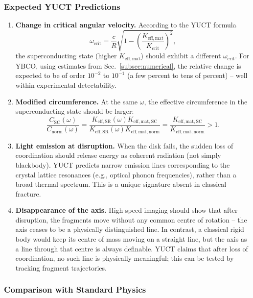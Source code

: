 \documentclass[12pt,a4paper]{article}
\begin{document}
\subsubsection{Expected YUCT Predictions}

\begin{enumerate}
	\item \textbf{Change in critical angular velocity.} According to the YUCT formula
	\[
	\omega_{\text{crit}} = \frac{c}{R}\sqrt{1 - \left(\frac{K_{\mathrm{eff,mat}}}{K_{\mathrm{crit}}}\right)^2},
	\]
	the superconducting state (higher \(K_{\mathrm{eff,mat}}\)) should exhibit a different \(\omega_{\text{crit}}\). For YBCO, using estimates from Sec.~\ref{subsec:numerical}, the relative change is expected to be of order \(10^{-2}\) to \(10^{-1}\) (a few percent to tens of percent) – well within experimental detectability.
	
	\item \textbf{Modified circumference.} At the same \(\omega\), the effective circumference in the superconducting state should be larger:
	\[
	\frac{C_{\text{SC}}(\omega)}{C_{\text{norm}}(\omega)} = \frac{K_{\mathrm{eff,SR}}(\omega) K_{\mathrm{eff,mat,SC}}}{K_{\mathrm{eff,SR}}(\omega) K_{\mathrm{eff,mat,norm}}} = \frac{K_{\mathrm{eff,mat,SC}}}{K_{\mathrm{eff,mat,norm}}} > 1.
	\]
	
	\item \textbf{Light emission at disruption.} When the disk fails, the sudden loss of coordination should release energy as coherent radiation (not simply blackbody). YUCT predicts narrow emission lines corresponding to the crystal lattice resonances (e.g., optical phonon frequencies), rather than a broad thermal spectrum. This is a unique signature absent in classical fracture.
	
	\item \textbf{Disappearance of the axis.} High‑speed imaging should show that after disruption, the fragments move without any common centre of rotation – the axis ceases to be a physically distinguished line. In contrast, a classical rigid body would keep its centre of mass moving on a straight line, but the axis as a line through that centre is always definable. YUCT claims that after loss of coordination, no such line is physically meaningful; this can be tested by tracking fragment trajectories.
\end{enumerate}

\subsubsection{Comparison with Standard Physics}
\end{document}
